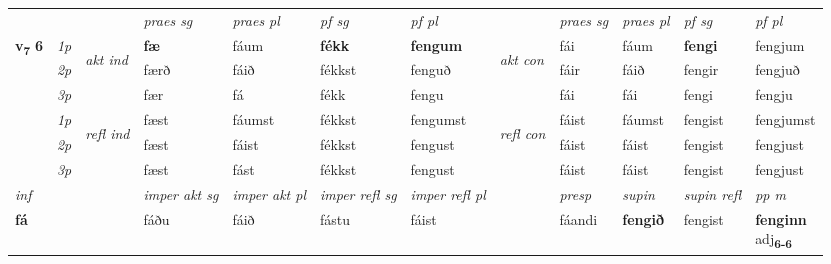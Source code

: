 \begin{longtable}[l]{X>{\footnotesize\itshape}llXXXXlXXXX}
\midrule
 & &   & \textit{praes sg}  & \textit{praes pl}    & \textit{ pf sg} & \textit{pf pl} & & \textit{praes sg}  & \textit{praes pl}    & \textit{pf sg} & \textit{pf pl }  \\ \cmidrule{4-7} \cmidrule{9-12}
 \multirow{2}{*}{{{\textbf{v{\textsubscript{7}}} \Large{\textbf{6}}}}}  & 1p & \multirow{3}{*}{\begin{turn}{90}\textit{akt ind}\end{turn}} & \textbf{fæ} & fáum & \textbf{fékk} & \textbf{fengum} & \multirow{3}{*}{\begin{turn}{90}\textit{akt con}\end{turn}} &fái & fáum & \textbf{fengi} & fengjum\\*
 & 2p &  &  færð  & fáið & fékkst & fenguð & & fáir & fáið & fengir & fengjuð \\*
 & 3p &  & fær & fá & fékk & fengu & & fái & fái& fengi & fengju \\*
\cmidrule{4-7} \cmidrule{9-12}
 & 1p & \multirow{3}{*}{\begin{turn}{90}\textit{refl ind}\end{turn}}  & fæst & fáumst & fékkst & fengumst & \multirow{3}{*}{\begin{turn}{90}\textit{refl con}\end{turn}}  &fáist & fáumst & fengist & fengjumst \\*
 & 2p &  & fæst & fáist & fékkst & fengust & &fáist & fáist & fengist & fengjust \\*
 & 3p  & & fæst & fást & fékkst & fengust & & fáist & fáist& fengist & fengjust \\*
\cmidrule{4-7} \cmidrule{9-12}

   {\textit{inf}} & &  & \textit{imper akt sg} & \textit{imper akt pl} & \textit{imper refl sg} & \textit{imper refl pl} && \textit{presp} & \textit{supin} & \textit{supin refl} & \textit{pp m} \\*
  {\textbf{fá}} & && fáðu  & fáið & fástu & fáist && fáandi &  \textbf{fengið} & fengist & \specialcell{\textbf{fenginn} \\ adj\textbf{\textsubscript{6-6}}} \\*

\midrule


\end{longtable}
